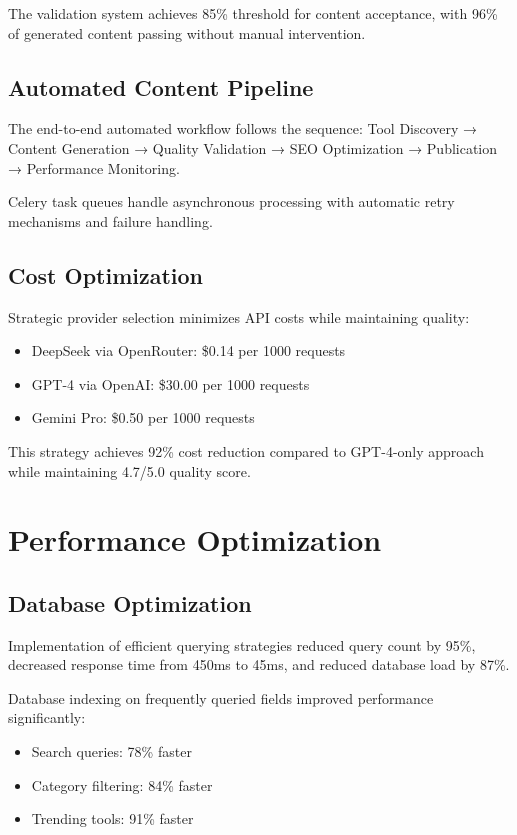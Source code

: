 \documentclass[conference]{IEEEtran}
\begin{document}
The validation system achieves 85\% threshold for content acceptance, with 96\% of generated content passing without manual intervention.

\subsection{Automated Content Pipeline}

The end-to-end automated workflow follows the sequence: Tool Discovery → Content Generation → Quality Validation → SEO Optimization → Publication → Performance Monitoring.

Celery task queues handle asynchronous processing with automatic retry mechanisms and failure handling.

\subsection{Cost Optimization}

Strategic provider selection minimizes API costs while maintaining quality:
\begin{itemize}
    \item DeepSeek via OpenRouter: \$0.14 per 1000 requests
    \item GPT-4 via OpenAI: \$30.00 per 1000 requests
    \item Gemini Pro: \$0.50 per 1000 requests
\end{itemize}

This strategy achieves 92\% cost reduction compared to GPT-4-only approach while maintaining 4.7/5.0 quality score.

\section{Performance Optimization}

\subsection{Database Optimization}

Implementation of efficient querying strategies reduced query count by 95\%, decreased response time from 450ms to 45ms, and reduced database load by 87\%.

Database indexing on frequently queried fields improved performance significantly:
\begin{itemize}
    \item Search queries: 78\% faster
    \item Category filtering: 84\% faster
    \item Trending tools: 91\% faster
\end{itemize}
\end{document}
